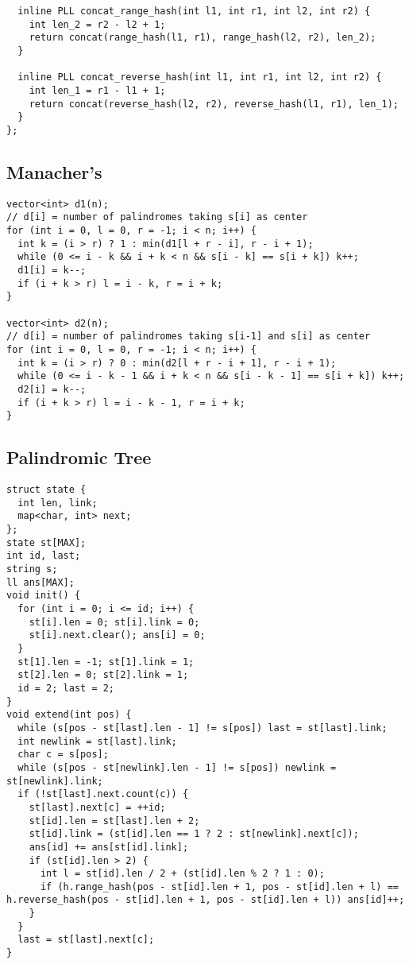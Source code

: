 \documentclass[FSZ,a4paper,onesided]{article}
\begin{document}
\begin{multicols*}{\COLS}
\begin{lstlisting}
  inline PLL concat_range_hash(int l1, int r1, int l2, int r2) {
    int len_2 = r2 - l2 + 1;
    return concat(range_hash(l1, r1), range_hash(l2, r2), len_2);
  }

  inline PLL concat_reverse_hash(int l1, int r1, int l2, int r2) {
    int len_1 = r1 - l1 + 1;
    return concat(reverse_hash(l2, r2), reverse_hash(l1, r1), len_1);
  }
};
\end{lstlisting}
\subsection{Manacher's}
\begin{lstlisting}
vector<int> d1(n);
// d[i] = number of palindromes taking s[i] as center
for (int i = 0, l = 0, r = -1; i < n; i++) {
  int k = (i > r) ? 1 : min(d1[l + r - i], r - i + 1);
  while (0 <= i - k && i + k < n && s[i - k] == s[i + k]) k++;
  d1[i] = k--;
  if (i + k > r) l = i - k, r = i + k;
}

vector<int> d2(n);
// d[i] = number of palindromes taking s[i-1] and s[i] as center
for (int i = 0, l = 0, r = -1; i < n; i++) {
  int k = (i > r) ? 0 : min(d2[l + r - i + 1], r - i + 1);
  while (0 <= i - k - 1 && i + k < n && s[i - k - 1] == s[i + k]) k++;
  d2[i] = k--;
  if (i + k > r) l = i - k - 1, r = i + k;
}
\end{lstlisting}
\subsection{Palindromic Tree}
\begin{lstlisting}
struct state {
  int len, link;
  map<char, int> next;
};
state st[MAX];
int id, last;
string s;
ll ans[MAX];
void init() {
  for (int i = 0; i <= id; i++) {
    st[i].len = 0; st[i].link = 0;
    st[i].next.clear(); ans[i] = 0;
  }
  st[1].len = -1; st[1].link = 1;
  st[2].len = 0; st[2].link = 1;
  id = 2; last = 2;
}
void extend(int pos) {
  while (s[pos - st[last].len - 1] != s[pos]) last = st[last].link;
  int newlink = st[last].link;
  char c = s[pos];
  while (s[pos - st[newlink].len - 1] != s[pos]) newlink = st[newlink].link;
  if (!st[last].next.count(c)) {
    st[last].next[c] = ++id;
    st[id].len = st[last].len + 2;
    st[id].link = (st[id].len == 1 ? 2 : st[newlink].next[c]);
    ans[id] += ans[st[id].link];
    if (st[id].len > 2) {
      int l = st[id].len / 2 + (st[id].len % 2 ? 1 : 0);
      if (h.range_hash(pos - st[id].len + 1, pos - st[id].len + l) == h.reverse_hash(pos - st[id].len + 1, pos - st[id].len + l)) ans[id]++;
    }
  }
  last = st[last].next[c];
}
\end{lstlisting}

\end{multicols*}
\end{document}
